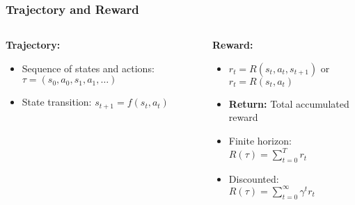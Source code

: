 \begin{frame}
    \frametitle{Trajectory and Reward}
    \setlength{\itemsep}{6pt}
    \begin{columns}[T]
        \begin{column}{0.5\textwidth}
            \textbf{Trajectory:}
            \begin{itemize}
                \item Sequence of states and actions: $\tau = (s_0, a_0, s_1, a_1, \ldots)$
                \item State transition: $s_{t+1} = f(s_t, a_t)$
            \end{itemize}
        \end{column}
        
        \begin{column}{0.5\textwidth}
            \textbf{Reward:}
            \begin{itemize}
                \item $r_t = R(s_t, a_t, s_{t+1})$ or $r_t = R(s_t, a_t)$
                \item \textbf{Return:} Total accumulated reward
                \item Finite horizon: $R(\tau) = \sum_{t = 0}^T r_t$
                \item Discounted: $R(\tau) = \sum_{t = 0}^{\infty} \gamma^t r_t$
            \end{itemize}
        \end{column}
    \end{columns}
\end{frame}


